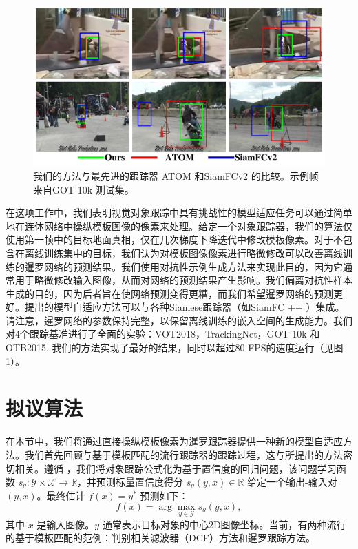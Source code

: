 \begin{figure}[t]
    \centering
    \includegraphics[width=1.0\textwidth]{Img/MTP/got10k/visulization2.pdf}
    \caption{我们的方法与最先进的跟踪器 ATOM \cite{danelljan2019atom} 和SiamFCv2 \cite{SiamFC} 的比较。示例帧来自GOT-10k \cite{GOT-10k} 测试集。}
    \label{fig:vis}
\end{figure}

在这项工作中，我们表明视觉对象跟踪中具有挑战性的模型适应任务可以通过简单地在连体网络中操纵模板图像的像素来处理。给定一个对象跟踪器，我们的算法仅使用第一帧中的目标地面真相，仅在几次梯度下降迭代中修改模板像素。对于不包含在离线训练集中的目标，我们认为对模板图像像素进行略微修改可以改善离线训练的暹罗网络的预测结果。我们使用对抗性示例生成方法来实现此目的，因为它通常用于略微修改输入图像，从而对网络的预测结果产生影响。我们偏离对抗性样本生成的目的，因为后者旨在使网络预测变得更糟，而我们希望暹罗网络的预测更好。提出的模型自适应方法可以与各种Siamese跟踪器（如SiamFC ++ \cite{SiamFC++}）集成。请注意，暹罗网络的参数保持完整，以保留离线训练的嵌入空间的生成能力。我们对4个跟踪基准进行了全面的实验：VOT2018\cite{kristan2018sixth}，TrackingNet\cite{muller2018trackingnet}，GOT-10k\cite{GOT-10k} 和 OTB2015\cite{OTB}. 我们的方法实现了最好的结果，同时以超过80 FPS的速度运行（见图 \ref{fig:vis}）。

\section{拟议算法}
在本节中，我们将通过直接操纵模板像素为暹罗跟踪器提供一种新的模型自适应方法。我们首先回顾与基于模板匹配的流行跟踪器的跟踪过程，这与所提出的方法密切相关。遵循 \cite{Danelljan_2020_CVPR}，我们将对象跟踪公式化为基于置信度的回归问题，该问题学习函数 $s_\theta:\mathcal{Y\times X\rightarrow \mathbb R}$，并预测标量置信度得分 $s_\theta(y,x)\in\mathbb R$ 给定一个输出-输入对 $(y,x)$。最终估计 $f(x)=y^*$ 预测如下：
\begin{equation}
    f(x) = \arg\max_{y\in \mathcal Y}s_\theta (y,x),
\end{equation}
其中 $x$ 是输入图像。$y$ 通常表示目标对象的中心2D图像坐标。当前，有两种流行的基于模板匹配的范例：判别相关滤波器（DCF）方法和暹罗跟踪方法。

